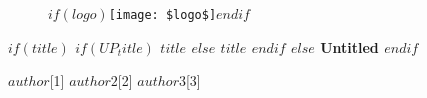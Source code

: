 \documentclass[$if(fontsize)$$fontsize$,$endif$$if(lang)$$babel-lang$,$endif$$if(papersize)$$papersize$paper,$endif$$for(classoption)$$classoption$$sep$,$endfor$]{article}
\begin{document}



    \begin{flushleft}
           \begin{figure}
			\centering
          \vspace{-2cm}
			$if(logo)$\texttt{[image: \$logo\$]}$endif$
		\end{figure}

       \large{ \textbf{ $if(title)$ $if(UP_title)$ \uppercase{$title$} $else$ $title$ $endif$ $else$ Untitled $endif$ }}



          \vspace{-0.1cm}

        \footnotesize	{\textbf{$author$}[1] \textbf{$author2$}[2] \textbf{$author3$}[3]}








\end{flushleft}
\end{document}
